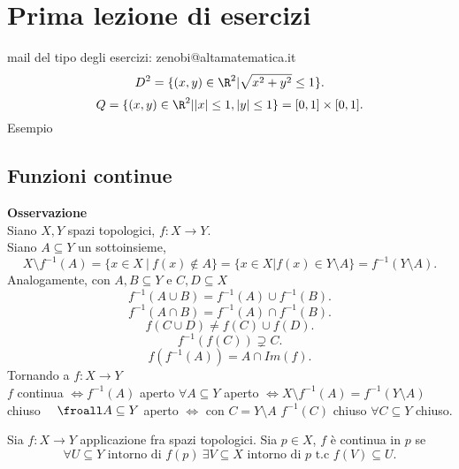 \documentclass{article}
\begin{document}

\maketitle
	\newpage
	\section{Prima lezione di esercizi}
	mail del tipo degli esercizi: zenobi@altamatematica.it
	\[
	 D^2 = \{(x,y)\in\R^2 | \sqrt {x^2 + y^2 }\leq 1\}
	.\] 
	\[
		Q = \{(x,y)\in\R^2 | |x|\leq 1, |y|\leq 1\} = [0,1]\times[0,1]
	.\] 
	Esempio


\maketitle
	\newpage
	\subsection{Funzioni continue}
	\textbf{Osservazione}\\
	Siano $X,Y$ spazi topologici, $f: X \rightarrow Y$.\\
	Siano $A\subseteq Y$ un sottoinsieme,
	 \[
		 X\setminus f^{-1}(A) = \{x\in X \ | \ f(x)\not\in A\} = \{x\in X | f(x) \in Y\setminus A\} = f^{-1}(Y\setminus A)
	.\] 
	Analogamente, con $A,B\subseteq Y$ e $C,D\subseteq X$
	\[
	 f^{-1}(A\cup B) = f^{-1}(A)\cup f^{-1}(B)
	.\] 
	\[
	f^{-1}(A\cap B) = f^{-1}(A)\cap f^{-1}(B)
	.\] 
	\[
	 f(C\cup D) \neq f(C)\cup f(D)
	.\] 
	\[
	 f^{-1}(f(C))\supsetneq C
	.\] 
	\[
	 f(f^{-1}(A)) = A\cap Im(f)
	.\] 
	Tornando a $f: X \rightarrow Y$\\
	$f$ continua $ \Leftrightarrow f^{-1}(A)$ aperto $\forall A\subseteq Y$ aperto $ \Leftrightarrow X\setminus f^{-1}(A) = f^{-1}(Y\setminus A) $ chiuso \ \ $\froall A\subseteq Y$ aperto $ \Leftrightarrow$ con $C = Y\setminus A$ $f^{-1}(C)$ chiuso $\forall C\subseteq Y$ chiuso.
	\begin{defi}[Continuità]
		Sia $f:X \rightarrow Y$ applicazione fra spazi topologici. Sia $p\in X$,  $f$ è continua in $p$ se
		\[
			\forall U\subseteq Y\text{ intorno di } f(p) \ \exists V\subseteq X \text{ intorno di } p \text{ t.c } f(V)\subseteq U
		.\] 
	\end{defi}
\end{document}
